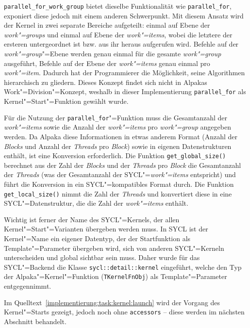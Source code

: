 \texttt{parallel\_for\_work\_group} bietet dieselbe Funktionalität wie
\texttt{parallel\_for}, exponiert diese jedoch mit einem anderen Schwerpunkt.
Mit diesem Ansatz wird der Kernel in zwei separate Bereiche aufgeteilt: einmal
auf Ebene der \textit{work"=groups} und einmal auf Ebene der
\textit{work"=items}, wobei die letztere der ersteren untergeordnet ist bzw.
aus ihr heraus aufgerufen wird. Befehle auf der \textit{work"=group}"=Ebene
werden genau einmal für die gesamte \textit{work"=group} ausgeführt, Befehle auf
der Ebene der \textit{work"=items} genau einmal pro \textit{work"=item}. Dadurch
hat der Programmierer die Möglichkeit, seine Algorithmen hierarchisch zu
gliedern. Dieses Konzept findet sich nicht in Alpakas Work"=Division"=Konzept,
weshalb in dieser Implementierung \texttt{parallel\_for} als
Kernel"=Start"=Funktion gewählt wurde.

Für die Nutzung der \texttt{parallel\_for}"=Funktion muss die Gesamtanzahl der
\textit{work"=items} sowie die Anzahl der \textit{work"=items} pro
\textit{work"=group} angegeben werden. Da Alpaka diese Informationen in etwas
anderem Format (Anzahl der \textit{Blocks} und Anzahl der \textit{Threads} pro
\textit{Block}) sowie in eigenen Datenstrukturen enthält, ist eine Konversion
erforderlich. Die Funktion \texttt{get\_global\_size()} berechnet aus der Zahl
der \textit{Blocks} und der \textit{Threads} pro \textit{Block} die Gesamtanzahl
der \textit{Threads} (was der Gesamtanzahl der SYCL"=\textit{work"=items}
entspricht) und führt die Konversion in ein SYCL"=kompatibles Format durch. Die
Funktion \texttt{get\_local\_size()} nimmt die Zahl der \textit{Threads} und
konvertiert diese in eine SYCL"=Datenstruktur, die die Zahl der
\textit{work"=items} enthält.

Wichtig ist ferner der Name des SYCL"=Kernels, der allen
Kernel"=Start"=Varianten übergeben werden muss. In SYCL ist der Kernel"=Name ein
eigener Datentyp, der der Startfunktion als Template"=Parameter übergeben wird,
sich von anderen SYCL"=Kerneln unterscheiden und global sichtbar sein muss.
Daher wurde für das SYCL"=Backend die Klasse \texttt{sycl::detail::kernel}
eingeführt, welche den Typ der Alpaka"=Kernel"=Funktion (\texttt{TKernelFnObj})
als Template"=Parameter entgegennimmt.

Im Quelltext~\ref{implementierung:task:kernel:launch} wird der Vorgang des
Kernel"=Starts gezeigt, jedoch noch ohne \texttt{accessors} -- diese werden
im nächsten Abschnitt behandelt.

